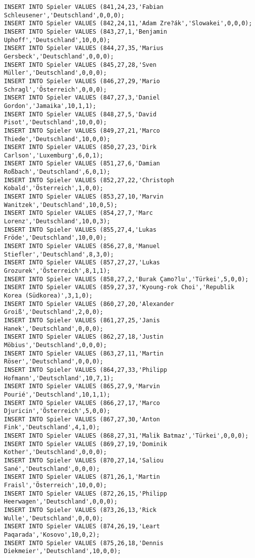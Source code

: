 \documentclass{lehramt-informatik-aufgabe}
\begin{document}
\begin{verbatim}
INSERT INTO Spieler VALUES (841,24,23,'Fabian Schleusener','Deutschland',0,0,0);
INSERT INTO Spieler VALUES (842,24,11,'Adam Zre?ák','Slowakei',0,0,0);
INSERT INTO Spieler VALUES (843,27,1,'Benjamin Uphoff','Deutschland',10,0,0);
INSERT INTO Spieler VALUES (844,27,35,'Marius Gersbeck','Deutschland',0,0,0);
INSERT INTO Spieler VALUES (845,27,28,'Sven Müller','Deutschland',0,0,0);
INSERT INTO Spieler VALUES (846,27,29,'Mario Schragl','Österreich',0,0,0);
INSERT INTO Spieler VALUES (847,27,3,'Daniel Gordon','Jamaika',10,1,1);
INSERT INTO Spieler VALUES (848,27,5,'David Pisot','Deutschland',10,0,0);
INSERT INTO Spieler VALUES (849,27,21,'Marco Thiede','Deutschland',10,0,0);
INSERT INTO Spieler VALUES (850,27,23,'Dirk Carlson','Luxemburg',6,0,1);
INSERT INTO Spieler VALUES (851,27,6,'Damian Roßbach','Deutschland',6,0,1);
INSERT INTO Spieler VALUES (852,27,22,'Christoph Kobald','Österreich',1,0,0);
INSERT INTO Spieler VALUES (853,27,10,'Marvin Wanitzek','Deutschland',10,0,5);
INSERT INTO Spieler VALUES (854,27,7,'Marc Lorenz','Deutschland',10,0,3);
INSERT INTO Spieler VALUES (855,27,4,'Lukas Fröde','Deutschland',10,0,0);
INSERT INTO Spieler VALUES (856,27,8,'Manuel Stiefler','Deutschland',8,3,0);
INSERT INTO Spieler VALUES (857,27,27,'Lukas Grozurek','Österreich',8,1,1);
INSERT INTO Spieler VALUES (858,27,2,'Burak Çamo?lu','Türkei',5,0,0);
INSERT INTO Spieler VALUES (859,27,37,'Kyoung-rok Choi','Republik Korea (Südkorea)',3,1,0);
INSERT INTO Spieler VALUES (860,27,20,'Alexander Groiß','Deutschland',2,0,0);
INSERT INTO Spieler VALUES (861,27,25,'Janis Hanek','Deutschland',0,0,0);
INSERT INTO Spieler VALUES (862,27,18,'Justin Möbius','Deutschland',0,0,0);
INSERT INTO Spieler VALUES (863,27,11,'Martin Röser','Deutschland',0,0,0);
INSERT INTO Spieler VALUES (864,27,33,'Philipp Hofmann','Deutschland',10,7,1);
INSERT INTO Spieler VALUES (865,27,9,'Marvin Pourié','Deutschland',10,1,1);
INSERT INTO Spieler VALUES (866,27,17,'Marco Djuricin','Österreich',5,0,0);
INSERT INTO Spieler VALUES (867,27,30,'Anton Fink','Deutschland',4,1,0);
INSERT INTO Spieler VALUES (868,27,31,'Malik Batmaz','Türkei',0,0,0);
INSERT INTO Spieler VALUES (869,27,19,'Dominik Kother','Deutschland',0,0,0);
INSERT INTO Spieler VALUES (870,27,14,'Saliou Sané','Deutschland',0,0,0);
INSERT INTO Spieler VALUES (871,26,1,'Martin Fraisl','Österreich',10,0,0);
INSERT INTO Spieler VALUES (872,26,15,'Philipp Heerwagen','Deutschland',0,0,0);
INSERT INTO Spieler VALUES (873,26,13,'Rick Wulle','Deutschland',0,0,0);
INSERT INTO Spieler VALUES (874,26,19,'Leart Paqarada','Kosovo',10,0,2);
INSERT INTO Spieler VALUES (875,26,18,'Dennis Diekmeier','Deutschland',10,0,0);

\end{verbatim}
\end{document}
